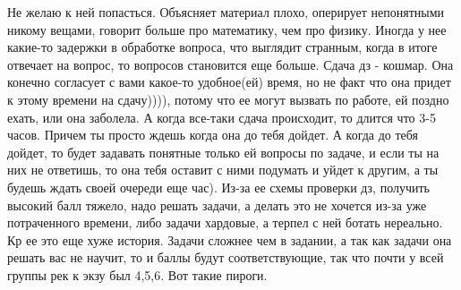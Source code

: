             \begin{commentbox} 
                Не желаю к ней попасться. Объясняет материал плохо, оперирует непонятными никому вещами, говорит больше про математику, чем про физику. Иногда у нее какие-то задержки в обработке вопроса, что выглядит странным, когда в итоге отвечает на вопрос, то вопросов становится еще больше. Сдача дз - кошмар. Она конечно согласует с вами какое-то удобное(ей) время, но не факт что она придет к этому времени на сдачу)))), потому что ее могут вызвать по работе, ей поздно ехать, или она заболела. А когда все-таки сдача происходит, то длится что 3-5 часов. Причем ты просто ждешь когда она до тебя дойдет. А когда до тебя дойдет, то будет задавать понятные только ей вопросы по задаче, и если ты на них не ответишь, то она тебя оставит с ними подумать и уйдет к другим, а ты будешь ждать своей очереди еще час). Из-за ее схемы проверки дз, получить высокий балл тяжело, надо решать задачи, а делать это не хочется из-за уже потраченного времени, либо задачи хардовые, а терпел с ней ботать нереально. Кр ее это еще хуже история. Задачи сложнее чем в задании, а так как задачи она решать вас не научит, то и баллы будут соответствующие, так что почти у всей группы рек к экзу был 4,5,6. Вот такие пироги. 
            \end{commentbox} 


